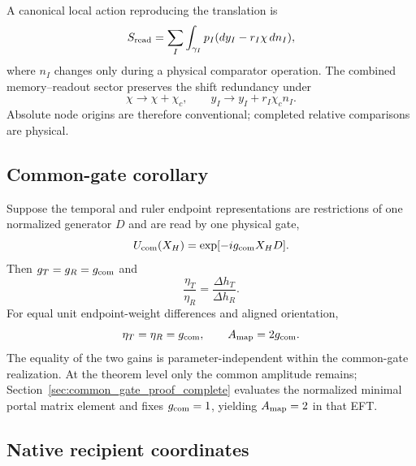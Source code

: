 \documentclass[aps,prd,twocolumn,10pt,superscriptaddress,nofootinbib]{revtex4-2}
\begin{document}
A canonical local action reproducing the translation is
\begin{equation}
S_{\rm read}
=\sum_I\int_{\gamma_I}p_I(dy_I-r_I\chi\,dn_I),
\label{eq:pb_read_action}
\end{equation}
where $n_I$ changes only during a physical comparator operation.  The
combined memory--readout sector preserves the shift redundancy under
\begin{equation}
\chi\rightarrow\chi+\chi_c,
\qquad
y_I\rightarrow y_I+r_I\chi_c n_I.
\label{eq:pb_combined_shift}
\end{equation}
Absolute node origins are therefore conventional; completed relative
comparisons are physical.

\subsection{Common-gate corollary}

Suppose the temporal and ruler endpoint representations are restrictions of
one normalized generator $D$ and are read by one physical gate,
\begin{equation}
U_{\rm com}(X_H)=\exp[-ig_{\rm com}X_HD].
\label{eq:pb_common_gate}
\end{equation}
Then $g_T=g_R=g_{\rm com}$ and
\begin{equation}
\frac{\eta_T}{\eta_R}
=\frac{\Delta h_T}{\Delta h_R}.
\label{eq:pb_gain_ratio}
\end{equation}
For equal unit endpoint-weight differences and aligned orientation,
\begin{equation}
\eta_T=\eta_R=g_{\rm com},
\qquad
A_{\rm map}=2g_{\rm com}.
\label{eq:pb_common_gain}
\end{equation}
The equality of the two gains is parameter-independent within the
common-gate realization.  At the theorem level only the common amplitude
remains; Section~\ref{sec:common_gate_proof_complete} evaluates the
normalized minimal portal matrix element and fixes $g_{\rm com}=1$, yielding
$A_{\rm map}=2$ in that EFT.

\subsection{Native recipient coordinates}
\end{document}
